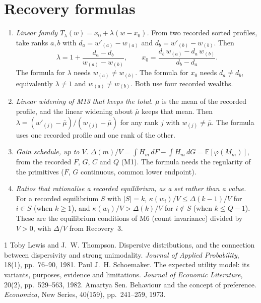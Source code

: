 \documentclass[11pt]{article}
\begin{document}
\section*{Recovery formulas}

\begin{enumerate}
\item \emph{Linear family $T_\lambda(w)=x_0+\lambda(w-x_0)$.} From two recorded
  sorted profiles, take ranks $a,b$ with $d_a=w'_{(a)}-w_{(a)}$ and
  $d_b=w'_{(b)}-w_{(b)}$. Then
  \[
    \lambda=1+\frac{d_a-d_b}{w_{(a)}-w_{(b)}},\qquad
    x_0=\frac{d_b\,w_{(a)}-d_a\,w_{(b)}}{d_b-d_a}.
  \]
  The formula for $\lambda$ needs $w_{(a)}\ne w_{(b)}$. The formula for $x_0$
  needs $d_a\ne d_b$, equivalently $\lambda\ne1$ and $w_{(a)}\ne w_{(b)}$. Both
  use four recorded wealths.
\item \emph{Linear widening of M13 that keeps the total.} $\bar\mu$ is the
  mean of the recorded profile, and the linear widening about $\bar\mu$ keeps
  that mean. Then $\lambda=(w'_{(j)}-\bar\mu)/(w_{(j)}-\bar\mu)$ for any rank $j$
  with $w_{(j)}\ne\bar\mu$. The formula uses one recorded profile and one rank
  of the other.
\item \emph{Gain schedule, up to $V$.} $\Delta(m)/V=\int H_m\,dF-\int
  H_m\,dG=\mathbb E[\varphi(M_m)]$, from the recorded $F$, $G$, $C$ and $Q$
  (M1). The formula needs the regularity of the primitives ($F$, $G$
  continuous, common lower endpoint).
\item \emph{Ratios that rationalise a recorded equilibrium, as a set rather
  than a value.} For a recorded equilibrium $S$ with $|S|=k$,
  $\kappa(w_i)/V\le\Delta(k-1)/V$ for $i\in S$ (when $k\ge1$), and
  $\kappa(w_i)/V>\Delta(k)/V$ for $i\notin S$ (when $k\le Q-1$). These are the
  equilibrium conditions of M6 (count invariance) divided by $V>0$,
  with $\Delta/V$ from Recovery~3.
\end{enumerate}

\begin{thebibliography}{1}
Toby Lewis and J.~W. Thompson.
\newblock Dispersive distributions, and the connection between dispersivity
  and strong unimodality.
\newblock \emph{Journal of Applied Probability}, 18(1), pp.~76--90, 1981.
Paul J.~H. Schoemaker.
\newblock The expected utility model: its variants, purposes, evidence and
  limitations.
\newblock \emph{Journal of Economic Literature}, 20(2), pp.~529--563, 1982.
Amartya Sen.
\newblock Behaviour and the concept of preference.
\newblock \emph{Economica}, New Series, 40(159), pp.~241--259, 1973.
\end{thebibliography}
\end{document}
